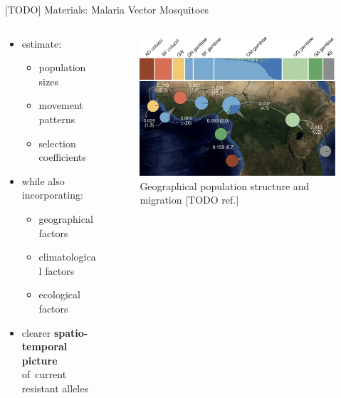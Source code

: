 \documentclass[final,hyperref={pdfpagelabels=false}]{beamer}
\begin{document}
\begin{frame}[t]
\begin{columns}[t]
\begin{column}{.465\textwidth}
\begin{block}{[TODO] Materials: Malaria Vector Mosquitoes}
\begin{columns} %
\begin{column}{.4\textwidth} %
\begin{itemize}
    \item estimate:
    \begin{itemize}
        \item population sizes
        \item movement patterns
        \item selection coefficients
    \end{itemize}
    
    \item while also incorporating:
    \begin{itemize}
        \item geographical factors
    	\item climatological factors
    	\item ecological factors
    \end{itemize}
    
    \item clearer \textbf{spatio-temporal picture} of~current resistant alleles
\end{itemize}
\end{column}

\begin{column}{.6\textwidth} %
\centering

\begin{figure}
\includegraphics[width=.95\linewidth]{nature-mosquitoes/fig_2}
\caption{Geographical population structure and migration [TODO ref.]}
\end{figure}


\end{column}
\end{columns}
\end{block}
\end{column}
\end{columns}
\end{frame}
\end{document}
